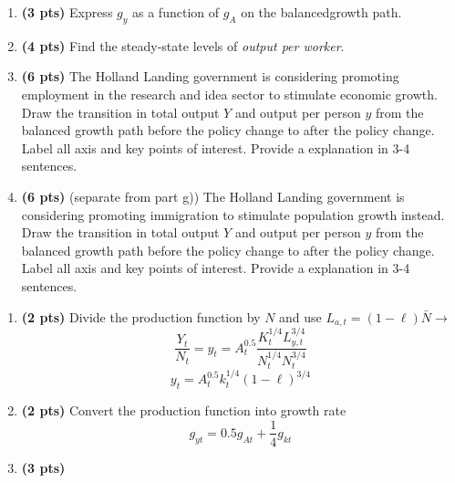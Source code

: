 \documentclass[addpoints,12pt,answers]{exam}
\begin{document}
\begin{enumerate}[label=\textbf{\arabic*.}, itemsep=15pt]
\begin{enumerate}[label=(\alph*)]
			\item \textbf{(3 pts)} Express $g_y$ as a function of $g_A$ on the balancedgrowth path. 
			\vspace{1cm}
			
			
			

			
			\item \textbf{(4 pts)}  Find the steady-state levels of \textit{output per worker}.
			\vspace{1cm}
			
			
			\item \textbf{(6 pts)} The Holland Landing government is considering promoting employment in the research and idea sector to stimulate economic growth. Draw the transition in total output $Y$ and  output per person $y$ from the balanced growth path before the policy change to after the policy change. Label all axis and key points of interest. Provide a explanation in 3-4 sentences.
			
			\vspace{1cm}
			\item \textbf{(6 pts)} (separate from part g)) The Holland Landing government is considering promoting immigration to stimulate population growth instead. Draw the transition in total output $Y$ and  output per person $y$ from the balanced growth path before the policy change to after the policy change. Label all axis and key points of interest. Provide a explanation in 3-4 sentences.
			
		\end{enumerate}
		
		\clearpage
		\begin{enumerate}[label=(\alph*)]
			\item \textbf{(2 pts)} 
			Divide the production function by $N$ and use $L_{a,t} = (1-\ell) \bar{N} \to $
			\[\frac{Y_t}{N_t} = y_t= A_t^{0.5} \frac{K_t^{1/4} L_{y,t}^{3/4}}{N_t^{1/4} N_{t}^{3/4}}  \]
			\[y_t= A_t^{0.5} k_t^{1/4} (1-\ell)^{3/4}\]
			
			\item \textbf{(2 pts)}
			Convert the production function into growth rate
			\[
			g_{yt} = 0.5 g_{At} + \frac{1}{4} g_{kt} 
			\]
			
			\item \textbf{(3 pts)} 
			

\end{enumerate}
\end{enumerate}
\end{document}
